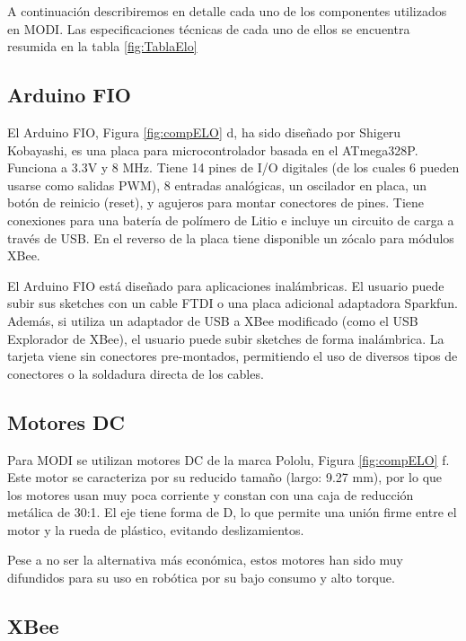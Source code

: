 A continuación describiremos en detalle cada uno de los componentes utilizados en MODI. Las especificaciones técnicas de cada uno de ellos se encuentra resumida en la tabla \ref{fig:TablaElo}

\subsection{Arduino FIO}
El Arduino FIO, Figura \ref{fig:compELO} d, ha sido diseñado por Shigeru Kobayashi, es una placa para microcontrolador basada en el ATmega328P. Funciona a 3.3V y 8 MHz. Tiene 14 pines de I/O digitales (de los cuales 6 pueden usarse como salidas PWM), 8 entradas analógicas, un oscilador en placa, un botón de reinicio (reset), y agujeros para montar conectores de pines. Tiene conexiones para una batería de polímero de Litio e incluye un circuito de carga a través de USB. En el reverso de la placa tiene disponible un zócalo para módulos XBee.

El Arduino FIO está diseñado para aplicaciones inalámbricas. El usuario puede subir sus sketches con un cable FTDI o una placa adicional adaptadora Sparkfun. Además, si utiliza un adaptador de USB a XBee modificado (como el USB Explorador de XBee), el usuario puede subir sketches de forma inalámbrica. La tarjeta viene sin conectores pre-montados, permitiendo el uso de diversos tipos de conectores o la soldadura directa de los cables. 

\subsection{Motores DC}
Para MODI se utilizan motores DC de la marca Pololu, Figura \ref{fig:compELO} f. Este motor se caracteriza por su reducido tamaño (largo: 9.27 mm), por lo que los motores usan muy poca corriente y constan con una caja de reducción metálica de 30:1. El eje tiene forma de D, lo que permite una unión firme entre el motor y la rueda de plástico, evitando deslizamientos.

Pese a no ser la alternativa más económica, estos motores han sido muy difundidos para su uso en robótica por su bajo consumo y alto torque. 
\subsection{XBee}

